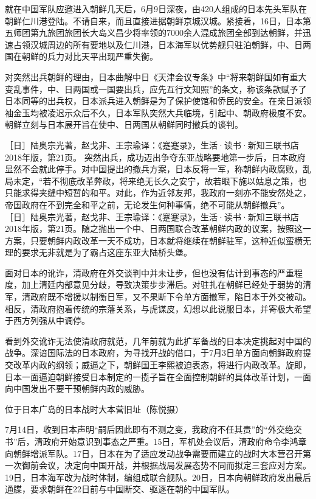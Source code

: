 \documentclass[12pt,UTF8]{ctexbook}
\begin{document}
就在中国军队应邀进入朝鲜几天后，6月9日深夜，由420人组成的日本先头军队在朝鲜仁川港登陆。不请自来，而且直接进据朝鲜京城汉城。紧接着，16日，日本第五师团第九旅团旅团长大岛义昌少将率领的7000余人混成旅团全部到达朝鲜，并迅速占领汉城周边的所有要地以及仁川港，日本海军以优势舰只驻泊朝鲜，中、日两国在朝鲜的兵力对比天平出现严重失衡。

对突然出兵朝鲜的理由，日本曲解中日《天津会议专条》中“将来朝鲜国如有重大变乱事件，中、日两国或一国要出兵，应先互行文知照”的条文，称该条款赋予了日本同等的出兵权，日本派兵进入朝鲜是为了保护使馆和侨民的安全。在亲日派领袖金玉均被凌迟示众后不久，日本军队突然大兵临境，引起中、朝政府极度不安。朝鲜立刻与日本展开旨在使中、日两国从朝鲜同时撤兵的谈判。

［日］陆奥宗光著，赵戈非、王宗瑜译：《蹇蹇录》，生活·读书·新知三联书店2018年版，第21页。
突然出兵，成功迈出争夺东亚战略要地第一步后，日本政府显然不会就此停手。对中国提出的撤兵方案，日本反将一军，称朝鲜内政腐败，乱局未定，“若不彻底改革弊政，将来绝无长久之安宁，故若眼下施以姑息之策，也只能求得夹缝中短暂的和平。对此，作为近邻友邦，我政府一刻亦不能安然处之，帝国政府在不到完全和平之前，无论发生何种事情，绝不可能从朝鲜撤兵”。 ［日］陆奥宗光著，赵戈非、王宗瑜译：《蹇蹇录》，生活·读书·新知三联书店2018年版，第21页。随之抛出一个中、日两国联合改革朝鲜内政的议案，按照这一方案，只要朝鲜内政改革一天不成功，日本就将继续在朝鲜驻军，这种近似蛮横无理的要求无非就是为了霸占这座东亚大陆桥头堡。

面对日本的讹诈，清政府在外交谈判中并未让步，但也没有估计到事态的严重程度，加上清廷内部意见分歧，导致决策步步滞后。对驻扎在朝鲜已经处于弱势的清军，清政府既不增援以制衡日军，又不果断下令单方面撤军，陷日本于外交被动。相反，清政府抱着传统的宗藩关系，与虎谋皮，幻想以此说服日本，并寄极大希望于西方列强从中调停。

看到外交讹诈无法使清政府就范，几年前就为此扩军备战的日本决定挑起对中国的战争。深谙国际法的日本政府，为寻找开战的借口，于7月3日单方面向朝鲜政府提交改革内政的纲领；威逼之下，朝鲜国王李熙被迫表态，将进行内政改革。旋即，日本一面逼迫朝鲜接受日本制定的一揽子旨在全面控制朝鲜的具体改革计划，一面向中国发出不要干预朝鲜内政的威胁。


位于日本广岛的日本战时大本营旧址（陈悦摄）

7月14日，收到日本声明“嗣后因此即有不测之变，我政府不任其责”的“外交绝交书”后，清政府开始意识到事态之严重。15日，军机处会议后，清政府命令李鸿章向朝鲜增派军队。17日，日本在为了适应发动战争需要而建立的战时大本营召开第一次御前会议，决定向中国开战，并根据战局发展态势不同而拟定三套应对方案。19日，日本海军改为战时体制，编组成联合舰队。20日，日本向朝鲜政府发出最后通牒，要求朝鲜在22日前与中国断交、驱逐在朝的中国军队。
\end{document}

